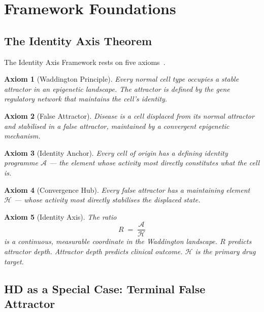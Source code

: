 \documentclass[12pt,a4paper]{article}
\newtheorem{axiom}{Axiom}
\newcommand{\Rratio}{R}
\newcommand{\IA}{\mathcal{A}}
\newcommand{\Hub}{\mathcal{H}}
\begin{document}
\section{Framework Foundations}

\subsection{The Identity Axis Theorem}

The Identity Axis Framework rests on five axioms~\cite{IAT2026}.

\begin{axiom}[Waddington Principle]
Every normal cell type occupies a stable attractor in an
epigenetic landscape. The attractor is defined by the gene
regulatory network that maintains the cell's identity.
\end{axiom}

\begin{axiom}[False Attractor]
Disease is a cell displaced from its normal attractor and
stabilised in a false attractor, maintained by a convergent
epigenetic mechanism.
\end{axiom}

\begin{axiom}[Identity Anchor]
Every cell of origin has a defining identity programme
$\IA$ --- the element whose activity most directly
constitutes what the cell is.
\end{axiom}

\begin{axiom}[Convergence Hub]
Every false attractor has a maintaining element $\Hub$
--- whose activity most directly stabilises the displaced
state.
\end{axiom}

\begin{axiom}[Identity Axis]
The ratio
\begin{equation}
  \Rratio \;=\; \frac{\IA}{\Hub}
  \label{eq:ratio}
\end{equation}
is a continuous, measurable coordinate in the Waddington
landscape. $\Rratio$ predicts attractor depth. Attractor
depth predicts clinical outcome. $\Hub$ is the primary drug
target.
\end{axiom}

\subsection{HD as a Special Case: Terminal False Attractor}
\end{document}
